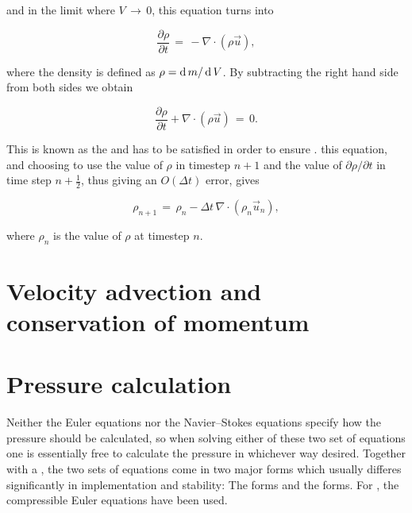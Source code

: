 and in the limit where $V \,\rightarrow\, 0$, this equation turns into

\begin{equation} \label{eq:density_partial_time_derivative}
\frac{\partial \rho}{\partial t} \,=\, -\nabla\cdot(\rho\vec{u}),
\end{equation}

where the density is defined as $\rho = \operatorname{d} m/\operatorname{d} V$. By subtracting the right hand side from both sides we obtain

\begin{equation} \label{eq:continuity_equation}
\frac{\partial \rho}{\partial t} + \nabla\cdot(\rho\vec{u}) \,=\, 0.
\end{equation}

This is known as the  and has to be satisfied in order to ensure .  this equation, and choosing to use the value of $\rho$ in timestep $n+1$ and the value of $\partial \rho/\partial t$ in time step $n+\frac{1}{2}$, thus giving an $O(\Delta t)$ error, gives

\begin{equation} \label{eq:continuity_equation_time_discretized}
\rho_{n+1} \,=\, \rho_{n} - \Delta t\,\nabla\cdot(\rho_{n}\vec{u}_{n}),
\end{equation}

where $\rho_{n}$ is the value of $\rho$ at timestep $n$.

\section{Velocity advection and conservation of momentum}

\section{Pressure calculation}

Neither the Euler equations nor the Navier--Stokes equations specify how the pressure should be calculated, so when solving either of these two set of equations one is essentially free to calculate the pressure in whichever way desired. Together with a , the two sets of equations come in two major forms which usually differes significantly in implementation and stability: The \compressible forms and the \incompressible forms. For \thiswork, the compressible Euler equations have been used. %

